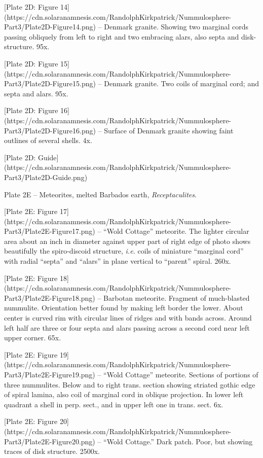 \documentclass[a4paper, 12pt, oneside]{article}
\begin{document}
[Plate 2D: Figure 14](https://cdn.solaranamnesis.com/RandolphKirkpatrick/Nummulosphere-Part3/Plate2D-Figure14.png) -- Denmark granite. Showing two marginal cords passing obliquely from left to right and two embracing alars, also septa and disk-structure. 95x.

[Plate 2D: Figure 15](https://cdn.solaranamnesis.com/RandolphKirkpatrick/Nummulosphere-Part3/Plate2D-Figure15.png) -- Denmark granite. Two coils of marginal cord; and septa and alars. 95x.

[Plate 2D: Figure 16](https://cdn.solaranamnesis.com/RandolphKirkpatrick/Nummulosphere-Part3/Plate2D-Figure16.png) -- Surface of Denmark granite showing faint outlines of several shells. 4x.

[Plate 2D: Guide](https://cdn.solaranamnesis.com/RandolphKirkpatrick/Nummulosphere-Part3/Plate2D-Guide.png)

Plate 2E -- Meteorites, melted Barbados earth, \emph{Receptaculites}.

[Plate 2E: Figure 17](https://cdn.solaranamnesis.com/RandolphKirkpatrick/Nummulosphere-Part3/Plate2E-Figure17.png) -- ``Wold Cottage'' meteorite. The lighter circular area about an inch in diameter against upper part of right edge of photo shows beautifully the spiro-discoid structure, \emph{i.e.} coils of miniature ``marginal cord'' with radial ``septa'' and ``alars'' in plane vertical to ``parent'' spiral. 260x.

[Plate 2E: Figure 18](https://cdn.solaranamnesis.com/RandolphKirkpatrick/Nummulosphere-Part3/Plate2E-Figure18.png) -- Barbotan meteorite. Fragment of much-blasted nummulite. Orientation better found by making left border the lower. About center is curved rim with circular lines of ridges and with bands across. Around left half are three or four septa and alars passing across a second cord near left upper corner. 65x.

[Plate 2E: Figure 19](https://cdn.solaranamnesis.com/RandolphKirkpatrick/Nummulosphere-Part3/Plate2E-Figure19.png) -- ``Wold Cottage'' meteorite. Sections of portions of three nummulites. Below and to right trans. section showing striated gothic edge of spiral lamina, also coil of marginal cord in oblique projection. In lower left quadrant a shell in perp. sect., and in upper left one in trans. sect. 6x.

[Plate 2E: Figure 20](https://cdn.solaranamnesis.com/RandolphKirkpatrick/Nummulosphere-Part3/Plate2E-Figure20.png) -- ``Wold Cottage.'' Dark patch. Poor, but showing traces of disk structure. 2500x.
\end{document}
